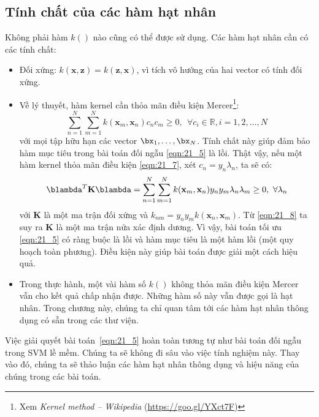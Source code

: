 \subsection{Tính chất của các hàm hạt nhân }
Không phải hàm $k()$ nào cũng có thể được sử dụng. Các hàm hạt nhân cần có các tính chất: 
\begin{itemize}
    \item Đối xứng: $k(\mathbf{x}, \mathbf{z}) = k(\mathbf{z}, \mathbf{x})$, vì
    tích vô hướng của hai vector có tính đối xứng. 
     
    \item {Về lý thuyết}, hàm kernel cần thỏa mãn điều kiện
    Mercer\footnote{Xem \textit{Kernel method -- Wikipedia}
    (\url{https://goo.gl/YXct7F})}:
    \begin{equation} 
    \label{eqn:21_7}
    \sum_{n=1}^N \sum_{m=1}^N k(\mathbf{x}_m, \mathbf{x}_n) c_nc_m \geq 0, ~~ \forall c_i \in \mathbb{R}, i = 1, 2, \dots, N 
    \end{equation} 
    với mọi tập hữu hạn các vector $\bx_1, \dots, \bx_N$. 
    Tính chất này giúp đảm bảo hàm mục tiêu trong bài toán đối ngẫu
    \eqref{eqn:21_5} là {lồi}. Thật vậy, nếu một hàm kernel thỏa mãn điều
    kiện \eqref{eqn:21_7}, xét $c_n = y_n \lambda_n$, ta sẽ có:  
    \begin{equation} 
    \label{eqn:21_8}
    \blambda^T \mathbf{K} \blambda = \sum_{n=1}^N \sum_{m=1}^N k(\mathbf{x}_m, \mathbf{x}_n) y_ny_m \lambda_n \lambda_m \geq 0, ~\forall \lambda_n 
    \end{equation} 
    với $\mathbf{K}$ là một ma trận đối xứng và $ k_{nm} = y_ny_m k(\mathbf{x}_n, \mathbf{x}_m) $.
    Từ \eqref{eqn:21_8} ta suy ra $\mathbf{K}$ là một ma trận nửa xác định dương. Vì vậy, bài toán tối ưu \eqref{eqn:21_5} có ràng buộc là lồi và hàm mục tiêu là một hàm lồi (một quy hoạch toàn phương). Điều kiện này giúp bài toán được giải một cách hiệu quả.  

    \item {Trong thực hành}, một vài hàm số $k()$ không thỏa mãn điều
    kiện Mercer vẫn cho kết quả chấp nhận được. Những hàm số này vẫn được
    gọi là hạt nhân. Trong chương này, chúng ta chỉ quan tâm tới các hàm
    hạt nhân thông dụng có sẵn trong các thư viện.
\end{itemize}
 
Việc giải quyết bài toán~\eqref{eqn:21_5} hoàn toàn tương tự như bài toán
đối ngẫu trong SVM lề mềm. Chúng ta sẽ không đi sâu vào việc tính nghiệm này. Thay
vào đó, chúng ta sẽ thảo luận các hàm hạt nhân thông dụng và hiệu năng của chúng trong các bài toán.
 
